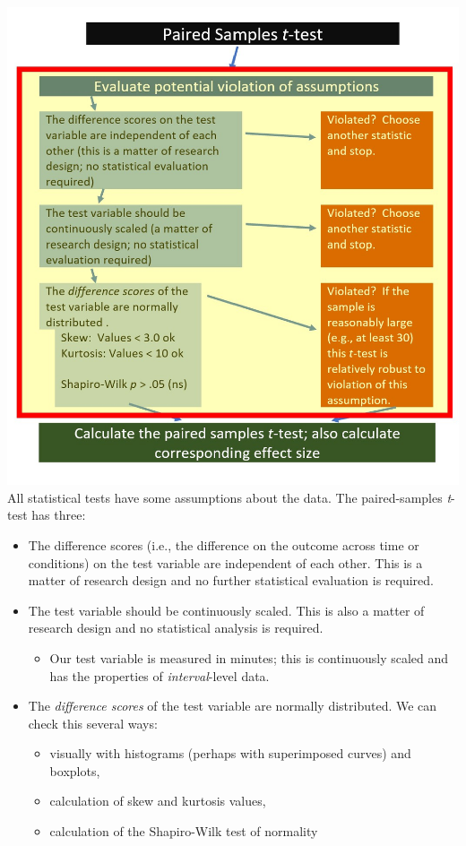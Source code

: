 \documentclass[
  11pt,
]{book}
\providecommand{\tightlist}{%
  \setlength{\itemsep}{0pt}\setlength{\parskip}{0pt}}
\begin{document}
\includegraphics{images/ttests/PairedAssmptns.jpg} All statistical tests have some assumptions about the data. The paired-samples \emph{t}-test has three:

\begin{itemize}
\tightlist
\item
  The difference scores (i.e., the difference on the outcome across time or conditions) on the test variable are independent of each other. This is a matter of research design and no further statistical evaluation is required.
\item
  The test variable should be continuously scaled. This is also a matter of research design and no statistical analysis is required.

  \begin{itemize}
  \tightlist
  \item
    Our test variable is measured in minutes; this is continuously scaled and has the properties of \emph{interval}-level data.
  \end{itemize}
\item
  The \emph{difference scores} of the test variable are normally distributed. We can check this several ways:

  \begin{itemize}
  \tightlist
  \item
    visually with histograms (perhaps with superimposed curves) and boxplots,
  \item
    calculation of skew and kurtosis values,
  \item
    calculation of the Shapiro-Wilk test of normality
  \end{itemize}
\end{itemize}
\end{document}
